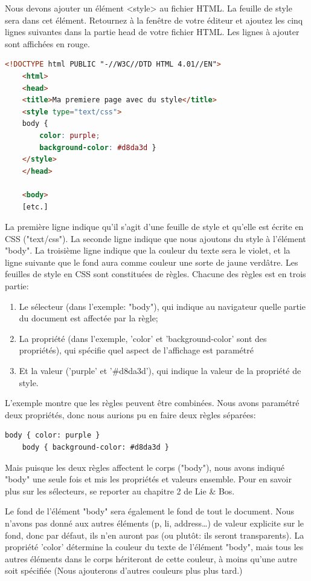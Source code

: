 Nous devons ajouter un élément <style> au fichier HTML. La feuille de style sera dans cet élément. Retournez à la fenêtre de votre éditeur et ajoutez les cinq lignes suivantes dans la partie head de votre fichier HTML. Les lignes à ajouter sont affichées en rouge. 
\begin{lstlisting}[language=html]
	<!DOCTYPE html PUBLIC "-//W3C//DTD HTML 4.01//EN">
	<html>
	<head>
	<title>Ma premiere page avec du style</title>
	<style type="text/css">
	body {
		color: purple;
		background-color: #d8da3d }
	</style>
	</head>
	
	<body>
	[etc.]
\end{lstlisting}
La première ligne indique qu'il s'agit d'une feuille de style et qu'elle est écrite en CSS ("text/css"). La seconde ligne indique que nous ajoutons du style à l'élément "body". La troisième ligne indique que la couleur du texte sera le violet, et la ligne suivante que le fond aura comme couleur une sorte de jaune verdâtre. 
Les feuilles de style en CSS sont constituées de règles. Chacune des règles est en trois partie:
\begin{enumerate}
	\item Le sélecteur (dans l'exemple: "body"), qui indique au navigateur quelle partie du document est affectée par la règle;
	\item La propriété (dans l'exemple, 'color' et 'background-color' sont des propriétés), qui spécifie quel aspect de l'affichage est paramétré
	\item Et la valeur ('purple' et '\#d8da3d'), qui indique la valeur de la propriété de style. 
\end{enumerate}
L'exemple montre que les règles peuvent être combinées. Nous avons paramétré deux propriétés, donc nous aurions pu en faire deux règles séparées:

\begin{lstlisting}[language=html]
	body { color: purple }
	body { background-color: #d8da3d }
\end{lstlisting}

Mais puisque les deux règles affectent le corps ("body"), nous avons indiqué "body" une seule fois et mis les propriétés et valeurs ensemble. Pour en savoir plus sur les sélecteurs, se reporter au chapitre 2 de Lie \& Bos. 
\normalsize

Le fond de l'élément "body" sera également le fond de tout le document. Nous n'avons pas donné aux autres éléments (p, li, address…) de valeur explicite sur le fond, donc par défaut, ils n'en auront pas (ou plutôt: ils seront transparents). La propriété 'color' détermine la couleur du texte de l'élément "body", mais tous les autres éléments dans le corps hériteront de cette couleur, à moins qu'une autre soit spécifiée (Nous ajouterons d'autres couleurs plus plus tard.)

